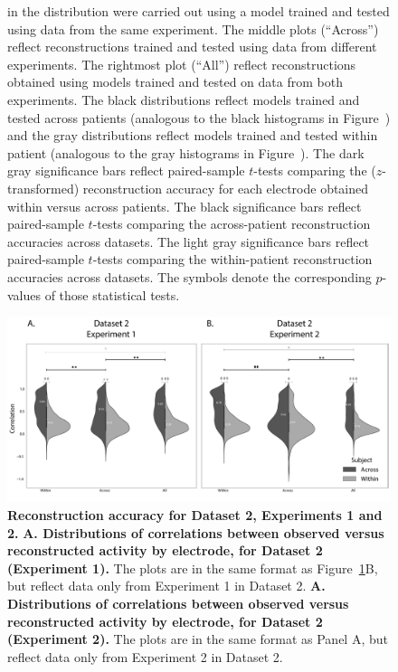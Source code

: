 \documentclass[11pt]{article}
\begin{document}
\begin{figure}[p]
{in the distribution were carried out using a model trained and tested using data
from the same experiment.  The middle plots (``Across'') reflect reconstructions
trained and tested using data from different experiments.  The rightmost plot
(``All'') reflect reconstructions obtained using models trained and tested on
data from both experiments.  The black distributions reflect models trained and
tested across patients (analogous to the black histograms in Figure~\corrmaps)
and the gray distributions reflect models trained and tested within patient
(analogous to the gray histograms in Figure~\corrmaps).  The dark gray
significance bars reflect paired-sample $t$-tests comparing the
($z$-transformed) reconstruction accuracy for each electrode obtained within
versus across patients.  The black significance bars reflect paired-sample
$t$-tests comparing the across-patient reconstruction accuracies across
datasets.  The light gray significance bars reflect paired-sample $t$-tests
comparing the within-patient reconstruction accuracies across datasets.  The
symbols denote the corresponding $p$-values of those statistical tests.}
\label{fig:supplemental_1}
\end{figure}


\begin{figure}[p]
\centering
\includegraphics[width=\textwidth]{figs/supplemental_2}
\caption{\textbf{Reconstruction accuracy for Dataset 2, Experiments 1
    and 2.}  \textbf{A. Distributions of correlations between observed
    versus reconstructed activity by electrode, for Dataset 2
    (Experiment 1).}  The plots are in the same format as
  Figure~\ref{fig:supplemental_1}B, but reflect data only from
  Experiment 1 in Dataset 2.  \textbf{A. Distributions of correlations between observed
    versus reconstructed activity by electrode, for Dataset 2
    (Experiment 2).}  The plots are in the same format as Panel A, but
    reflect data only from Experiment 2 in Dataset 2.}
\label{fig:supplemental_2}
\end{figure}
\end{document}

